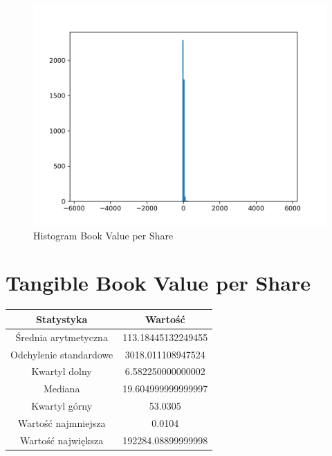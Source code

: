 \documentclass{article}
\begin{document}
\begin{figure}[h!]
    \includegraphics[width=\linewidth]{variables/Book Value per Share.png}
    \caption{Histogram Book Value per Share }
\end{figure}\section{ Tangible Book Value per Share }

\begin{center}
    \begin{tabular}{|c | c|} 
    \hline
    Statystyka & Wartość \\
    \hline\hline
    Średnia arytmetyczna & 113.18445132249455 \\ 
    \hline
    Odchylenie standardowe & 3018.011108947524 \\
    \hline
    Kwartyl dolny & 6.582250000000002 \\
    \hline
    Mediana & 19.604999999999997 \\
    \hline
    Kwartyl górny & 53.0305 \\
    \hline
    Wartość najmniejsza & 0.0104 \\
    \hline
    Wartość największa & 192284.08899999998 \\
    \hline
   \end{tabular}
\end{center}
\end{document}
